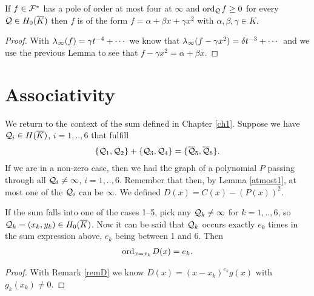 \documentclass[english,11pt,a4paper]{article}
\begin{document}
\begin{lemma}\label{fourpoles}
  If $f \in \mathcal{F}^*$ has a pole of order at most four at $\infty$ and $\text{ord}_{\mathcal{Q}}\hspace{0.4mm} f \geq 0$ for every $\mathcal{Q} \in H_0(\overline K)$ then $f$ is of the form $f = \alpha + \beta x + \gamma x^2$ with $\alpha, \beta, \gamma \in K$.
  \begin{proof}
    With $\lambda_{\infty} (f) = \gamma t^{-4} + \cdots$ we know that $\lambda_{\infty} (f - \gamma x^2) = \delta t^{-3} + \cdots$ and we use the previous Lemma to see that $f - \gamma x^2 = \alpha + \beta x$.
  \end{proof}
\end{lemma}

\newpage

\section{Associativity}

We return to the context of the sum defined in Chapter \ref{ch1}. Suppose we have $\mathcal{Q}_i \in H(\overline K)$, $i=1,..,6$ that fulfill
\begin{align*}
  \{ \mathcal{Q}_1 , \mathcal{Q}_2\}+\{\mathcal{Q}_3 , \mathcal{Q}_4\} = \{\overline {\mathcal{Q}}_5 , \overline {\mathcal{Q}}_6 \}.
\end{align*}
If we are in a non-zero case, then we had the graph of a polynomial $P$ passing through all $\mathcal{Q}_i \neq \infty$, $i = 1,..,6$. Remember that then, by Lemma \ref{atmost1}, at most one of the $\mathcal{Q}_i$ can be $\infty$. We defined $D(x) = C(x) - (P(x))^2$.
\begin{lemma}\label{mult}
  If the sum falls into one of the cases 1--5, pick any $\mathcal{Q}_k \neq \infty$ for $k = 1,..,6$, so $\mathcal{Q}_k = (x_k, y_k) \in H_0(\overline K)$. Now it can be said that $\mathcal{Q}_k$ occurs exactly $e_k$ times in the sum expression above, $e_k$ being between
  1 and 6. %
  Then\vspace{-3mm}
  \begin{align*}
    \text{ord}_{x=x_k}\hspace{0.4mm} D(x) = e_k.
  \end{align*}
  \begin{proof} With  Remark \ref{remD} we know $D(x) = (x - x_k)^{e_k} g(x)$ with $g_k(x_k) \neq 0$.
  \end{proof}
\end{lemma}
\end{document}
